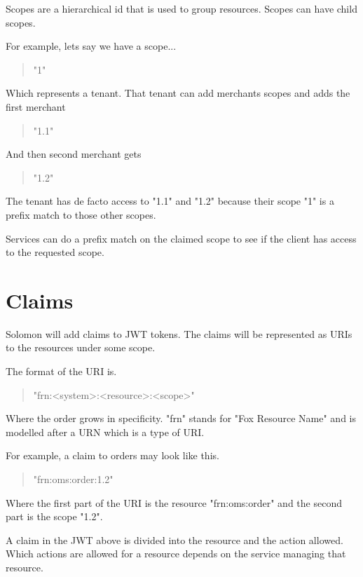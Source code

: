 \documentclass[11pt]{article}
\begin{document}
Scopes are a hierarchical id that is used to group resources. Scopes can have
child scopes.

For example, lets say we have a scope...

\begin{quote}
"1"
\end{quote}

Which represents a tenant. That tenant can add merchants scopes and adds the 
first merchant 

\begin{quote}
"1.1"
\end{quote}

And then second merchant gets

\begin{quote}
"1.2"
\end{quote}

The tenant has de facto access to "1.1" and "1.2" because their scope "1" is a 
prefix match to those other scopes.

Services can do a prefix match on the claimed scope to see if the client
has access to the requested scope.

\section{Claims}

Solomon will add claims to JWT tokens. The claims will be represented as URIs
to the resources under some scope. 

The format of the URI is.

\begin{quote}
    "frn:\textless system\textgreater :\textless resource\textgreater :\textless scope\textgreater "
\end{quote}

Where the order grows in specificity. "frn" stands for "Fox Resource Name"
and is modelled after a URN which is a type of URI.

For example, a claim to orders may look like this.

\begin{quote}
    "frn:oms:order:1.2"
\end{quote}

Where the first part of the URI is the resource "frn:oms:order" and the second
part is the scope "1.2".

A claim in the JWT above is divided into the resource and the action allowed.
Which actions are allowed for a resource depends on the service managing that resource.
\end{document}
